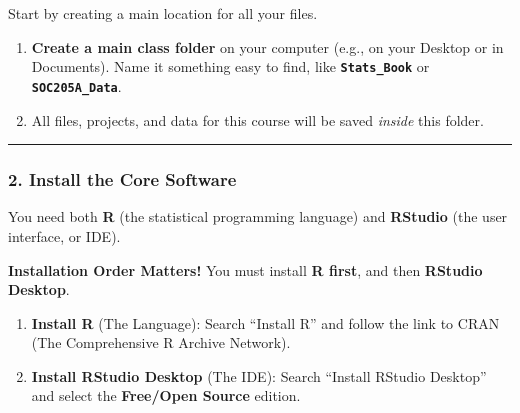 \documentclass[
  letterpaper,
  DIV=11,
  numbers=noendperiod]{scrreprt}
\providecommand{\tightlist}{%
  \setlength{\itemsep}{0pt}\setlength{\parskip}{0pt}}
\begin{document}
Start by creating a main location for all your files.

\begin{enumerate}
\def\labelenumi{\arabic{enumi}.}
\tightlist
\item
  \textbf{Create a main class folder} on your computer (e.g., on your
  Desktop or in Documents). Name it something easy to find, like
  \textbf{\texttt{Stats\_Book}} or \textbf{\texttt{SOC205A\_Data}}.
\item
  All files, projects, and data for this course will be saved
  \emph{inside} this folder.
\end{enumerate}

\begin{center}\rule{0.5\linewidth}{0.5pt}\end{center}

\subsubsection{2. Install the Core
Software}\label{install-the-core-software}

You need both \textbf{R} (the statistical programming language) and
\textbf{RStudio} (the user interface, or IDE).

\begin{tcolorbox}[enhanced jigsaw, left=2mm, leftrule=.75mm, title=\textcolor{quarto-callout-important-color}{\faExclamation}\hspace{0.5em}{Important}, titlerule=0mm, toprule=.15mm, colframe=quarto-callout-important-color-frame, opacitybacktitle=0.6, bottomtitle=1mm, rightrule=.15mm, colbacktitle=quarto-callout-important-color!10!white, toptitle=1mm, arc=.35mm, colback=white, opacityback=0, bottomrule=.15mm, breakable, coltitle=black]

\textbf{Installation Order Matters!} You must install \textbf{R first},
and then \textbf{RStudio Desktop}.

\begin{enumerate}
\def\labelenumi{\arabic{enumi}.}
\tightlist
\item
  \textbf{Install R} (The Language): Search ``Install R'' and follow the
  link to CRAN (The Comprehensive R Archive Network).
\item
  \textbf{Install RStudio Desktop} (The IDE): Search ``Install RStudio
  Desktop'' and select the \textbf{Free/Open Source} edition.
\end{enumerate}

\end{tcolorbox}
\end{document}
